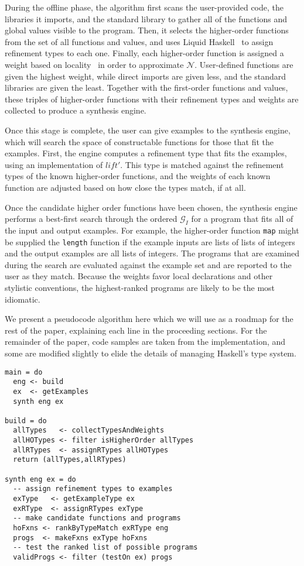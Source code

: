 During the offline phase, the algorithm first scans the user-provided code, the libraries it imports, and the standard library to gather all of the functions and global values visible to the program. Then, it selects the higher-order functions from the set of all functions and values, and uses Liquid Haskell~\cite{DBLP:conf/haskell/VazouSJ14, DBLP:conf/esop/VazouRJ13, DBLP:conf/icfp/VazouSJVJ14} to assign refinement types to each one. Finally, each higher-order function is assigned a weight based on locality~\cite{DBLP:conf/pldi/GveroKKP13} in order to approximate $\mathcal{N}$. User-defined functions are given the highest weight, while direct imports are given less, and the standard libraries are given the least. Together with the first-order functions and values, these triples of higher-order functions with their refinement types and weights are collected to produce a synthesis engine.

Once this stage is complete, the user can  give examples to the synthesis engine, which will search the space of constructable functions for those that fit the examples.
First, the engine computes a refinement type that fits the examples, using an implementation of $lift'$.
This type is matched against the refinement types of the known higher-order functions, and the weights of each known function are adjusted based on how close the types match, if at all.

Once the candidate higher order functions have been chosen, the synthesis engine performs a best-first search through the ordered $\mathcal{G}_I$ for a program that fits all of the input and output examples.
For example, the higher-order function \texttt{map} might be supplied the \texttt{length} function if the example inputs are lists of lists of integers and the output examples are all lists of integers. 
The programs that are examined during the search are evaluated against the example set and are reported to the user as they match. 
Because the weights favor local declarations and other stylistic conventions, the highest-ranked programs are likely to be the most idiomatic.

We present a pseudocode algorithm here which we will use as a roadmap for the rest of the paper, explaining each line in the proceeding sections. For the remainder of the paper, code samples are taken from the implementation, and some are modified slightly to elide the details of managing Haskell's type system.

\begin{lstlisting}[caption=A pseudocode representation of the build and synthesis stages of the synthesis algorithm, label=listing:Algo]
main = do
  eng <- build
  ex  <- getExamples
  synth eng ex

build = do
  allTypes   <- collectTypesAndWeights
  allHOTypes <- filter isHigherOrder allTypes
  allRTypes  <- assignRTypes allHOTypes
  return (allTypes,allRTypes)

synth eng ex = do
  -- assign refinement types to examples
  exType   <- getExampleType ex
  exRType  <- assignRTypes exType
  -- make candidate functions and programs
  hoFxns <- rankByTypeMatch exRType eng
  progs  <- makeFxns exType hoFxns
  -- test the ranked list of possible programs
  validProgs <- filter (testOn ex) progs
\end{lstlisting}

